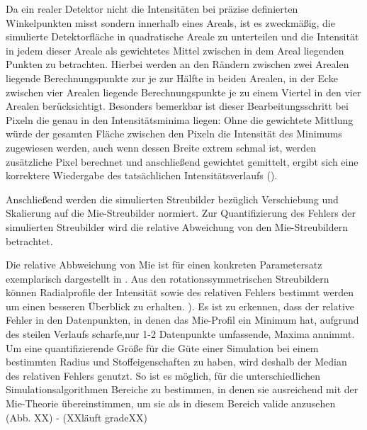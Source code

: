 Da ein realer Detektor nicht die Intensitäten bei präzise definierten Winkelpunkten misst sondern innerhalb eines Areals, ist es zweckmäßig, die simulierte Detektorfläche in quadratische Areale zu unterteilen und die Intensität in jedem dieser Areale als gewichtetes Mittel zwischen in dem Areal liegenden Punkten zu betrachten.
Hierbei werden an den Rändern zwischen zwei Arealen liegende Berechnungspunkte zur je zur Hälfte in beiden Arealen, in der Ecke zwischen vier Arealen liegende Berechnungspunkte je zu einem Viertel in den vier Arealen berücksichtigt.
Besonders bemerkbar ist dieser Bearbeitungsschritt bei Pixeln die genau in den Intensitätsminima liegen: Ohne die gewichtete Mittlung würde der gesamten Fläche zwischen den Pixeln die Intensität des Minimums zugewiesen werden, auch wenn dessen Breite extrem schmal ist, werden zusätzliche Pixel berechnet und anschließend gewichtet gemittelt, ergibt sich eine korrektere Wiedergabe des tatsächlichen Intensitätsverlaufs ().

Anschließend werden die simulierten Streubilder bezüglich Verschiebung und Skalierung auf die Mie-Streubilder normiert. Zur Quantifizierung des Fehlers der simulierten Streubilder wird die relative Abweichung von den Mie-Streubildern betrachtet.

Die relative Abbweichung von Mie ist für einen konkreten Parametersatz exemplarisch dargestellt in . Aus den rotationssymmetrischen Streubildern können Radialprofile der Intensität sowie des relativen Fehlers bestimmt werden um einen besseren Überblick zu erhalten. ).
Es ist zu erkennen, dass der relative Fehler in den Datenpunkten, in denen das Mie-Profil ein Minimum hat, aufgrund des steilen Verlaufs scharfe,nur 1-2 Datenpunkte umfassende, Maxima annimmt.
Um eine quantifizierende Größe für die Güte einer Simulation bei einem bestimmten Radius und Stoffeigenschaften zu haben, wird deshalb der Median des relativen Fehlers genutzt. So ist es möglich, für die unterschiedlichen Simulationsalgorithmen Bereiche zu bestimmen, in denen sie ausreichend mit der Mie-Theorie übereinstimmen, um sie als in diesem Bereich valide anzusehen (Abb. XX) - (XXläuft gradeXX)


